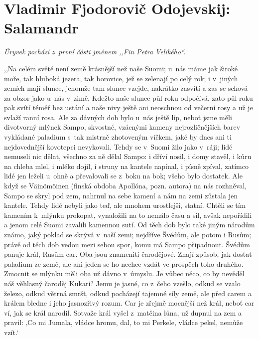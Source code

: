 \section{Vladimir Fjodorovič Odojevskij: Salamandr}

\noindent
\textit{Úryvek pochází z~první části jménem ,,Fin Petra Velikého``.}

\medskip
\noindent
,,Na celém světě není země krásnější než naše Suomi; u~nás máme jak široké moře, tak hluboká jezera, tak borovice, jež se zelenají po celý rok; i v jiných zemích mají slunce, jenomže tam slunce vzejde, nakrátko zasvítí a zas se schová za obzor jako u~nás v zimě. Kdežto naše slunce půl roku odpočívá, zato půl roku pak svítí téměř bez ustání a naše nivy ještě ani neoschnou od večerní rosy a už je svlaží ranní rosa. Ale za dávných dob bylo u~nás ještě líp, neboť jsme měli divotvorný mlýnek Sampo, skvostné, vzácnými kameny nejrozličnějších barev vykládané paladium s tak mistrně zhotoveným víčkem, jaké by dnes ani ti nejdovednější kovotepci nevykovali. Tehdy se v Suomi žilo jako v ráji; lidé nemuseli nic dělat, všechno za ně dělal Sampo: i dříví nosil, i domy stavěl, i kůru na chleba mlel, i mléko dojil, i struny na kantele napínal, i písně zpíval, zatímco lidé jen leželi u~ohně a převalovali se z boku na bok; všeho bylo dostatek. Ale když se Väinömöinen (finská obdoba Apollóna, pozn. autora) na nás rozhněval, Sampo se skryl pod zem, nahrnul na sebe kamení a nám na zemi zůstala jen kantele. Tehdy lidé nebyli jako teď, ale mnohem urostlejší, statní. Chtěli se tím kamením k mlýnku prokopat, vynaložili na to nemálo času a sil, avšak nepořídili a jenom celé Suomi zavalili kamennou sutí. Od těch dob bylo také jiným národům známo, jaký poklad se skrývá v naší zemi; nejdříve Švédům, ale potom i Rusům; právě od těch dob vedou mezi sebou spor, komu má Sampo připadnout. Švédům panuje král, Rusům car. Oba jsou znamenití čarodějové. Znají způsob, jak dostat paladium ze země, ale ani jeden se ho nechce vzdát ve prospěch toho druhého. Zmocnit se mlýnku měli oba už dávno v úmyslu. Je vůbec něco, co by nevěděl náš věhlasný čaroděj Kukari? Jemu je jasné, co z čeho vzešlo, odkud se vzalo železo, odkud větrná smršť, odkud pocházejí tajemné síly země, ale před carem a králem bledne i jeho jasnozřivý rozum. Car je zřejmě mocnější než král, neboť car ví, jak se král narodil. Sotvaže král vyšel z matčina lůna, už dupnul na zem a pravil: ‚Co mi Jumala, vládce hromu, dal, to mi Perkele, vládce pekel, nemůže vzít.‘

